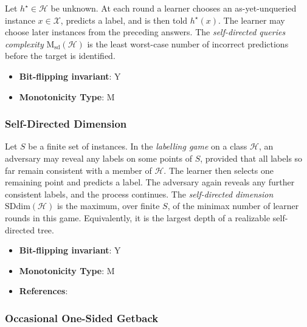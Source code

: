       \begin{definition}\label{def:self-directed_queries_complexity}
      Let $h^\star\in\mathcal H$ be unknown.  At each round a learner chooses an as-yet-unqueried instance $x\in\mathcal X$, predicts a label, and is then told $h^\star(x)$.  The learner may choose later instances from the preceding answers.  The \emph{self-directed queries complexity} $\mathrm M_{\mathrm{sd}}(\mathcal H)$ is the least worst-case number of incorrect predictions before the target is identified.
      \end{definition}
      \begin{itemize}
      \item {\bf Bit-flipping invariant}: Y
      \item {\bf Monotonicity Type}: M
      \end{itemize}
\subsubsection{Self-Directed Dimension}

      \begin{definition}\label{def:selfdirected_dimension}
      Let $S$ be a finite set of instances.  In the \emph{labelling game} on
      a class $\mathcal H$, an adversary may reveal any labels on some points
      of $S$, provided that all labels so far remain consistent with a member
      of $\mathcal H$.  The learner then selects one remaining point and
      predicts a label.  The adversary again reveals any further consistent
      labels, and the process continues.  The \emph{self-directed dimension}
      $\mathrm{SDdim}(\mathcal H)$ is the maximum, over finite $S$, of the
      minimax number of learner rounds in this game.  Equivalently, it is the
      largest depth of a realizable self-directed tree.
      \end{definition}
      \begin{itemize}
      \item {\bf Bit-flipping invariant}: Y
      \item {\bf Monotonicity Type}: M
      \item {\bf References}: \cite{devulapalli2024selfdirected}
      \end{itemize}
\subsubsection{Occasional One-Sided Getback}
      
